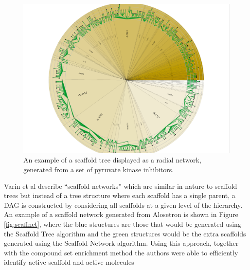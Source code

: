 \documentclass[]{book}
\begin{document}
\begin{figure}[h]
  \centering
  \includegraphics[width=0.9\linewidth]{img/scafftree-full}
  \caption{An example of a scaffold tree displayed as a  radial
    network, generated from a set of pyruvate kinase inhibitors.}
  \label{fig:scafftree}
\end{figure}

Varin et al \cite{Varin:2011ve} describe ``scaffold networks'' which
are similar in nature to scaffold trees but instead of a tree
structure where each scaffold has a single parent, a DAG is
constructed by considering all scaffolds at a given level of the
hierarchy. An example of a scaffold network generated from Alosetron
is shown in Figure \ref{fig:scaffnet}, where the blue structures are
those that would be generated using the Scaffold Tree algorithm and
the green structures would be the extra scaffolds generated using the
Scaffold Network algorithm. Using this approach, together with the
compound set enrichment method \cite{Varin:2010zh} the authors were
able to efficiently identify active scaffold and active molecules
\end{document}
